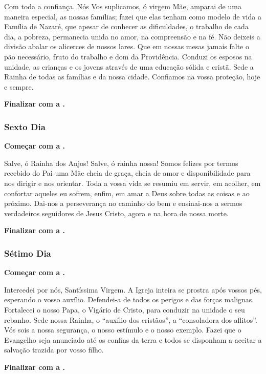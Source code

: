 \documentclass[a4paper,12pt]{extarticle} \usepackage[utf8]{inputenc}
\begin{document}
Com toda a confiança. Nós Vos suplicamos, ó virgem Mãe, amparai de uma maneira especial, as nossas famílias; fazei que elas tenham como modelo de vida a Família de Nazaré, que apesar de conhecer as dificuldades, o trabalho de cada dia, a pobreza, permanecia unida no amor, na compreensão e na fé. Não deixeis a divisão abalar os alicerces de nossos lares. Que em nossas mesas jamais falte o pão necessário, fruto do trabalho e dom da Providência. Conduzi os esposos na unidade, as crianças e os jovens através de uma educação sólida e cristã. Sede a Rainha de todas as famílias e da nossa cidade. Confiamos na vossa proteção, hoje e sempre.

\textbf{Finalizar com a .}


\subsubsection{Sexto Dia}

\textbf{Começar com a .}


Salve, ó Rainha dos Anjos! Salve, ó rainha nossa!  Somos felizes por termos recebido do Pai uma Mãe cheia de graça, cheia de amor e disponibilidade para nos dirigir e nos orientar. Toda a vossa vida se resumiu em servir, em acolher, em confortar aqueles eu sofrem, enfim, em amar a Deus sobre todas as coisas e ao próximo. Dai-nos a perseverança no caminho do bem e ensinai-nos a sermos verdadeiros seguidores de Jesus Cristo, agora e na hora de nossa morte.


\textbf{Finalizar com a .}


\subsubsection{Sétimo Dia}

\textbf{Começar com a .}

Intercedei por nós, Santíssima Virgem.  A Igreja inteira se prostra após vossos pés, esperando o vosso auxílio. Defendei-a de todos os perigos e das forças malignas. Fortalecei o nosso Papa, o Vigário de Cristo, para conduzir na unidade o seu rebanho. Sede nossa Rainha, o “auxílio dos cristãos”, a “consoladora dos aflitos”. Vós sois a nossa segurança, o nosso estímulo e o nosso exemplo. Fazei que o Evangelho seja anunciado até os confins da terra e todos se disponham a aceitar a salvação trazida por vosso filho.

\textbf{Finalizar com a .}
\end{document}
